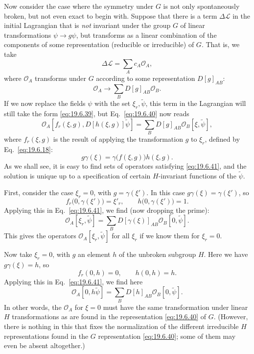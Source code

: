 Now consider the case where the symmetry under $G$ is not only spontaneously broken, but not even exact to begin with. Suppose that there is a term $\Delta\mathcal L$ in the initial Lagrangian that is \emph{not} invariant under the group $G$ of linear transformations $\psi\to g\psi$, but transforms as a linear combination of the components of some representation (reducible or irreducible) of $G$. That is, we take
\begin{equation}
\Delta\mathcal L=\sum_Ac_A\mathcal O_A,
\tag{19.6.39}\label{eq:19.6.39}
\end{equation}
where $\mathcal O_A$ transforms under $G$ according to some representation $D[g]_{AB}$:
\begin{equation}
\mathcal O_A\longrightarrow\sum_BD[g]_{AB}\mathcal O_B.
\tag{19.6.40}\label{eq:19.6.40}
\end{equation}
If we now replace the fields $\psi$ with the set $\xi_r,\widetilde\psi$, this term in the Lagrangian will still take the form \eqref{eq:19.6.39}, but Eq.~\eqref{eq:19.6.40} now reads
\begin{equation}
\mathcal O_A\left[
f_r(\xi,g),D[h(\xi,g)]\widetilde\psi
\right]
=\sum_BD[g]_{AB}\mathcal O_B[\xi,\widetilde\psi],
\tag{19.6.41}\label{eq:19.6.41}
\end{equation}
where $f_r(\xi,g)$ is the result of applying the transformation $g$ to $\xi_r$, defined by Eq.~\eqref{eq:19.6.18}:
\begin{equation}
g\gamma(\xi)=\gamma\bigl(f(\xi,g)\bigr)h(\xi,g).
\tag{19.6.42}\label{eq:19.6.42}
\end{equation}
As we shall see, it is easy to find sets of operators satisfying \eqref{eq:19.6.41}, and the solution is unique up to a specification of certain $H$-invariant functions of the $\widetilde\psi$.

First, consider the case $\xi_r=0$, with $g=\gamma(\xi')$. In this case $g\gamma(\xi)=\gamma(\xi')$, so
\[
f_r\bigl(0,\gamma(\xi')\bigr)=\xi'_r,
\qquad
h\bigl(0,\gamma(\xi')\bigr)=1.
\]
Applying this in Eq.~\eqref{eq:19.6.41}, we find (now dropping the prime):
\begin{equation}
\mathcal O_A[\xi_r,\widetilde\psi]
=\sum_BD[\gamma(\xi)]_{AB}\mathcal O_B[0,\widetilde\psi].
\tag{19.6.43}\label{eq:19.6.43}
\end{equation}
This gives the operators $\mathcal O_A[\xi_r,\widetilde\psi]$ for all $\xi_r$ if we know them for $\xi_r=0$.

Now take $\xi_r=0$, with $g$ an element $h$ of the unbroken subgroup $H$. Here we have $g\gamma(\xi)=h$, so
\[
f_r(0,h)=0,
\qquad
h(0,h)=h.
\]
Applying this in Eq.~\eqref{eq:19.6.41}, we find here
\begin{equation}
\mathcal O_A[0,h\widetilde\psi]
=\sum_BD[h]_{AB}\mathcal O_B[0,\widetilde\psi].
\tag{19.6.44}\label{eq:19.6.44}
\end{equation}
In other words, the $\mathcal O_A$ for $\xi=0$ must have the same transformation under linear $H$ transformations as are found in the representation \eqref{eq:19.6.40} of $G$. (However, there is nothing in this that fixes the normalization of the different irreducible $H$ representations found in the $G$ representation \eqref{eq:19.6.40}; some of them may even be absent altogether.)

